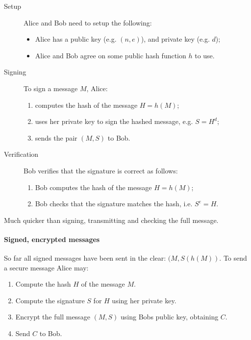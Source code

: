 \documentclass[a4paper, 11pt, openany]{book}
\begin{document}
\begin{description}
\item [Setup] Alice and Bob need to setup the following:
\begin{itemize}
    \item Alice has a public key (e.g. $(n,e)$), and private key (e.g. $d$);

    \item Alice and Bob agree on some public hash function $h$ to use.
\end{itemize}

\item [Signing] To sign a message $M$, Alice:
\begin{enumerate}
    \item computes the hash of the message $H = h(M)$;

    \item uses her private key to sign the hashed message, e.g. $S = H^d$;

    \item sends the pair $(M,S)$ to Bob.
\end{enumerate}

\item [Verification] Bob verifies that the signature is correct as follows:
\begin{enumerate}
    \item Bob computes the hash of the message $H = h(M)$;

    \item Bob checks that the signature matches the hash, i.e. $S^e = H$.
\end{enumerate}
\end{description}

Much quicker than signing, transmitting and checking the full message.



\paragraph{Signed, encrypted messages}

So far all signed messages have been sent in the clear: $(M, S(h(M) )$. To send a secure message Alice may:
\begin{enumerate}
    \item Compute the hash $H$ of the message $M$.

    \item Compute the signature $S$ for $H$ using her private key.

    \item Encrypt the full message $(M,S)$ using Bobs public key, obtaining $C$.

    \item Send $C$ to Bob.
\end{enumerate}
\end{document}
